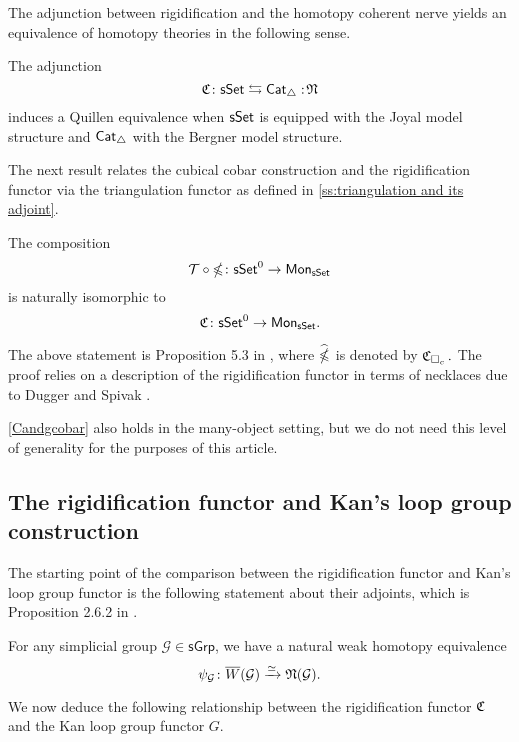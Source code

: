 The adjunction between rigidification and the homotopy coherent nerve yields an equivalence of homotopy theories in the following sense.

\begin{theorem} \label{joyalbergner}
	The adjunction
	$$\operatorname{\mathfrak{C}} \colon \mathsf{sSet} \leftrightarrows \mathsf{Cat}_{\triangle} :\!\operatorname{\mathfrak{N}}$$
	induces a Quillen equivalence when $\mathsf{sSet}$ is equipped with the Joyal model structure and $\mathsf{Cat}_{\triangle}$ with the Bergner model structure.
\end{theorem}

The next result relates the cubical cobar construction and the rigidification functor via the triangulation functor as defined in  \cref{ss:triangulation and its adjoint}.

\begin{proposition} \label{Candgcobar}
	The composition 
	$$\mathcal{T} \circ \operatorname{\mathbb{\Omega}} \colon \mathsf{sSet}^0 \to \mathsf{Mon}_{\mathsf{sSet}}$$
	is naturally isomorphic to
	$$\operatorname{\mathfrak{C}} \colon \mathsf{sSet}^0 \to \mathsf{Mon}_{\mathsf{sSet}}.$$
\end{proposition}

The above statement is Proposition 5.3 in \cite{rivera2018cubical}, where $\widehat{\operatorname{\mathbb{\Omega}}}$ is denoted by $\operatorname{\mathfrak{C}}_{\square_c}.$ The proof relies on a description of the rigidification functor in terms of necklaces due to Dugger and Spivak \cite{dugger2011rigidification}.

\cref{Candgcobar} also holds in the many-object setting, but we do not need this level of generality for the purposes of this article.

\subsection{The rigidification functor and Kan's loop group construction}

The starting point of the comparison between the rigidification functor and Kan's loop group functor is the following statement about their adjoints, which is Proposition 2.6.2 in \cite{hinich2007deformation}.

\begin{proposition} \label{hinich}
	For any simplicial group $\mathcal{G} \in \mathsf{sGrp}$, we have a natural weak homotopy equivalence
	$$\psi_{\mathcal{G}} \colon \overline{W}(\mathcal{G}) \xrightarrow{\simeq} \operatorname{\mathfrak{N}}(\mathcal{G}).$$
\end{proposition} 

We now deduce the following relationship between the rigidification functor $\operatorname{\mathfrak{C}}$ and the Kan loop group functor $G$.

